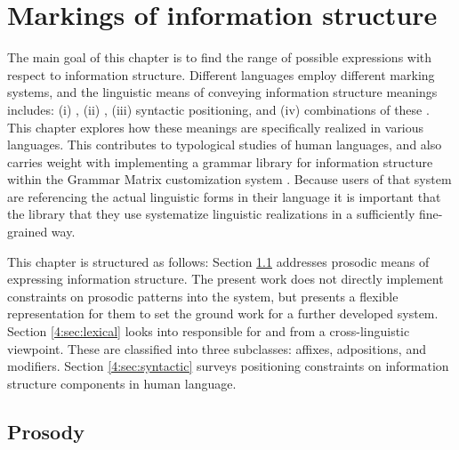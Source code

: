 \chapter{Markings of information structure}
\label{chapter4}
\setcounter{enums}{0}


\noindent The main goal of this chapter is to find the range of
possible expressions with respect to information structure. Different
languages employ different marking systems, and the linguistic means
of conveying information structure meanings includes: (i)
, (ii) , (iii) syntactic
positioning, and (iv) combinations of these \citep{gundel:99}. This
chapter explores how these meanings are specifically realized in
various languages.  This contributes to typological studies of human
languages, and also carries weight with implementing a grammar library
for information structure within the \lingo Grammar Matrix
customization system
\citep{bender:flickinger:05,drellishak:09,bender:etal:10}.  Because
users of that system are referencing the actual linguistic forms in
their language it is important that the library that they use
systematize linguistic realizations in a sufficiently fine-grained
way.


This chapter is structured as follows: Section \ref{4:sec:prosody} addresses
prosodic means of expressing information structure. The
present work does not directly implement constraints on prosodic
patterns into the system, but presents a flexible representation for
them to set the ground work for a further developed system.
Section \ref{4:sec:lexical} looks into  responsible for
 and  from a cross-linguistic viewpoint. These are
classified into three subclasses: affixes, adpositions, and
modifiers. Section \ref{4:sec:syntactic} surveys positioning
constraints on information structure components in human language.





\section{Prosody}
\label{4:sec:prosody}

